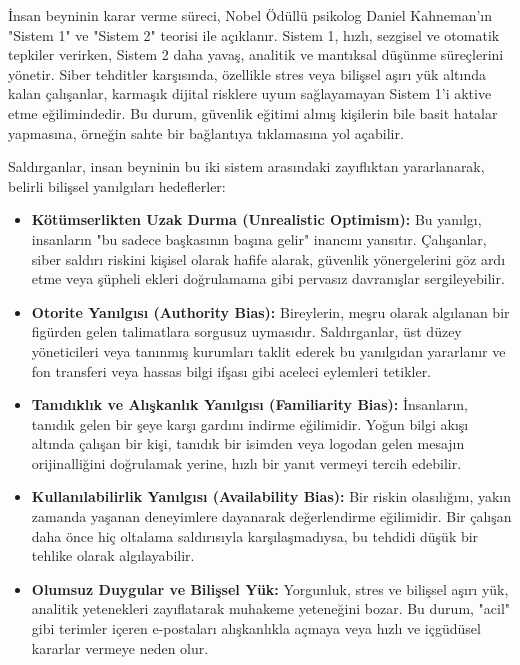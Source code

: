 İnsan beyninin karar verme süreci, Nobel Ödüllü psikolog Daniel Kahneman'ın "Sistem 1" ve "Sistem 2" teorisi ile açıklanır. Sistem 1, hızlı, sezgisel ve otomatik tepkiler verirken, Sistem 2 daha yavaş, analitik ve mantıksal düşünme süreçlerini yönetir. Siber tehditler karşısında, özellikle stres veya bilişsel aşırı yük altında kalan çalışanlar, karmaşık dijital risklere uyum sağlayamayan Sistem 1'i aktive etme eğilimindedir. Bu durum, güvenlik eğitimi almış kişilerin bile basit hatalar yapmasına, örneğin sahte bir bağlantıya tıklamasına yol açabilir.

Saldırganlar, insan beyninin bu iki sistem arasındaki zayıflıktan yararlanarak, belirli bilişsel yanılgıları hedeflerler:

\begin{itemize}
    \item \textbf{Kötümserlikten Uzak Durma (Unrealistic Optimism):} Bu yanılgı, insanların "bu sadece başkasının başına gelir" inancını yansıtır. Çalışanlar, siber saldırı riskini kişisel olarak hafife alarak, güvenlik yönergelerini göz ardı etme veya şüpheli ekleri doğrulamama gibi pervasız davranışlar sergileyebilir.
    \item \textbf{Otorite Yanılgısı (Authority Bias):} Bireylerin, meşru olarak algılanan bir figürden gelen talimatlara sorgusuz uymasıdır. Saldırganlar, üst düzey yöneticileri veya tanınmış kurumları taklit ederek bu yanılgıdan yararlanır ve fon transferi veya hassas bilgi ifşası gibi aceleci eylemleri tetikler.
    \item \textbf{Tanıdıklık ve Alışkanlık Yanılgısı (Familiarity Bias):} İnsanların, tanıdık gelen bir şeye karşı gardını indirme eğilimidir. Yoğun bilgi akışı altında çalışan bir kişi, tanıdık bir isimden veya logodan gelen mesajın orijinalliğini doğrulamak yerine, hızlı bir yanıt vermeyi tercih edebilir.
    \item \textbf{Kullanılabilirlik Yanılgısı (Availability Bias):} Bir riskin olasılığını, yakın zamanda yaşanan deneyimlere dayanarak değerlendirme eğilimidir. Bir çalışan daha önce hiç oltalama saldırısıyla karşılaşmadıysa, bu tehdidi düşük bir tehlike olarak algılayabilir.
    \item \textbf{Olumsuz Duygular ve Bilişsel Yük:} Yorgunluk, stres ve bilişsel aşırı yük, analitik yetenekleri zayıflatarak muhakeme yeteneğini bozar. Bu durum, "acil" gibi terimler içeren e-postaları alışkanlıkla açmaya veya hızlı ve içgüdüsel kararlar vermeye neden olur.
\end{itemize}

